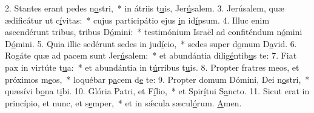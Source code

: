 2. Stantes erant pedes n\uline{o}stri,~* in átriis t\uline{u}is, Jer\uline{ú}salem.
3. Jerúsalem, quæ ædificátur ut c\uline{í}vitas:~* cujus participátio ejus \uline{i}n id\uline{í}psum.
4. Illuc enim ascendérunt tribus, tribus D\uline{ó}mini:~* testimónium Israël ad confiténdum n\uline{ó}mini D\uline{ó}mini.
5. Quia illic sedérunt sedes in jud\uline{í}cio,~* sedes super d\uline{o}mum D\uline{a}vid.
6. Rogáte quæ ad pacem sunt Jer\uline{ú}salem:~* et abundántia dilig\uline{é}ntib\uline{u}s te:
7. Fiat pax in virtúte t\uline{u}a:~* et abundántia in t\uline{ú}rribus t\uline{u}is.
8. Propter fratres meos, et próximos m\uline{e}os,~* loquébar p\uline{a}cem d\uline{e} te:
9. Propter domum Dómini, Dei n\uline{o}stri,~* quæsívi b\uline{o}na t\uline{i}bi.
10. Glória Patri, et F\uline{í}lio,~* et Spir\uline{í}tui S\uline{a}ncto.
11. Sicut erat in princípio, et nunc, et s\uline{e}mper,~* et in sǽcula sæcul\uline{ó}rum. \uline{A}men.
